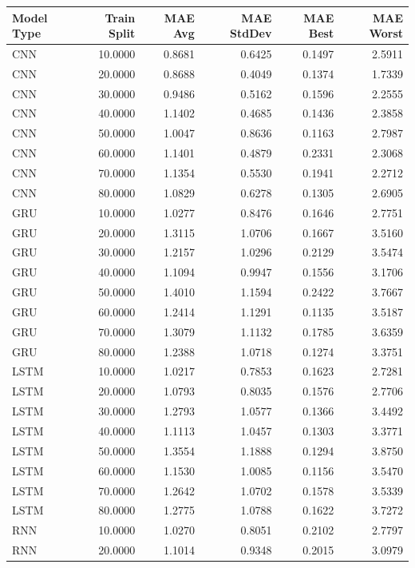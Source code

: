 \begin{tabular}{lrrrrr}
\toprule
Model Type & Train Split & MAE Avg & MAE StdDev & MAE Best & MAE Worst \\
\midrule
CNN & 10.0000 & 0.8681 & 0.6425 & 0.1497 & 2.5911 \\
CNN & 20.0000 & 0.8688 & 0.4049 & 0.1374 & 1.7339 \\
CNN & 30.0000 & 0.9486 & 0.5162 & 0.1596 & 2.2555 \\
CNN & 40.0000 & 1.1402 & 0.4685 & 0.1436 & 2.3858 \\
CNN & 50.0000 & 1.0047 & 0.8636 & 0.1163 & 2.7987 \\
CNN & 60.0000 & 1.1401 & 0.4879 & 0.2331 & 2.3068 \\
CNN & 70.0000 & 1.1354 & 0.5530 & 0.1941 & 2.2712 \\
CNN & 80.0000 & 1.0829 & 0.6278 & 0.1305 & 2.6905 \\
GRU & 10.0000 & 1.0277 & 0.8476 & 0.1646 & 2.7751 \\
GRU & 20.0000 & 1.3115 & 1.0706 & 0.1667 & 3.5160 \\
GRU & 30.0000 & 1.2157 & 1.0296 & 0.2129 & 3.5474 \\
GRU & 40.0000 & 1.1094 & 0.9947 & 0.1556 & 3.1706 \\
GRU & 50.0000 & 1.4010 & 1.1594 & 0.2422 & 3.7667 \\
GRU & 60.0000 & 1.2414 & 1.1291 & 0.1135 & 3.5187 \\
GRU & 70.0000 & 1.3079 & 1.1132 & 0.1785 & 3.6359 \\
GRU & 80.0000 & 1.2388 & 1.0718 & 0.1274 & 3.3751 \\
LSTM & 10.0000 & 1.0217 & 0.7853 & 0.1623 & 2.7281 \\
LSTM & 20.0000 & 1.0793 & 0.8035 & 0.1576 & 2.7706 \\
LSTM & 30.0000 & 1.2793 & 1.0577 & 0.1366 & 3.4492 \\
LSTM & 40.0000 & 1.1113 & 1.0457 & 0.1303 & 3.3771 \\
LSTM & 50.0000 & 1.3554 & 1.1888 & 0.1294 & 3.8750 \\
LSTM & 60.0000 & 1.1530 & 1.0085 & 0.1156 & 3.5470 \\
LSTM & 70.0000 & 1.2642 & 1.0702 & 0.1578 & 3.5339 \\
LSTM & 80.0000 & 1.2775 & 1.0788 & 0.1622 & 3.7272 \\
RNN & 10.0000 & 1.0270 & 0.8051 & 0.2102 & 2.7797 \\
RNN & 20.0000 & 1.1014 & 0.9348 & 0.2015 & 3.0979 \\

\end{tabular}
